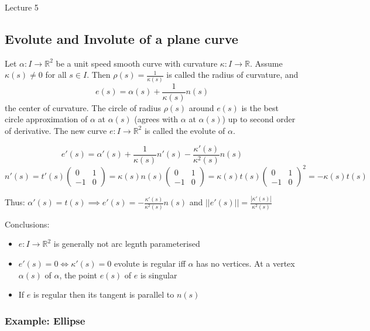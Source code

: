 \begin{center}

Lecture 5

\end{center}

\subsection{Evolute and Involute of a plane curve}

Let $\alpha: I \rightarrow \mathbb{R}^2$ be a unit speed smooth curve with curvature $\kappa: I \rightarrow \mathbb{R}$. Assume $\kappa(s) \neq 0$ for all $s \in I$. Then $\rho(s) = \frac{1}{\kappa(s)}$ is called the radius of curvature, and $$e(s) = \alpha(s) + \frac{1}{\kappa(s)} n(s)$$ the center of curvature. The circle of radius $\rho(s)$ around $e(s)$ is the best circle approximation of $\alpha$ at $\alpha(s)$ (agrees with $\alpha$ at $\alpha(s)$) up to second order of derivative. The new curve $e: I \rightarrow \mathbb{R}^2$ is called the evolute of $\alpha$.

$$e'(s) = \alpha'(s) + \frac{1}{\kappa(s)} n'(s) - \frac{\kappa'(s)}{\kappa^2(s)} n(s)$$
$$n'(s) = t'(s) \begin{pmatrix} 0 & 1 \\ -1 & 0 \end{pmatrix} = \kappa(s) n(s) \begin{pmatrix} 0 & 1 \\ -1 & 0 \end{pmatrix} = \kappa(s) t(s) \begin{pmatrix} 0 & 1 \\ -1 & 0 \end{pmatrix}^2 = -\kappa(s) t(s)$$

Thus: $\alpha'(s) = t(s) \implies e'(s) = - \frac{\kappa'(s)}{\kappa^2(s)} n(s)$ and $||e'(s)|| = \frac{|\kappa'(s)|}{\kappa^2 (s)}$

Conclusions:
\begin{itemize}
\item $e:I\rightarrow \mathbb{R}^2$ is generally not arc legnth parameterised
\item $e'(s) = 0 \Leftrightarrow \kappa'(s) = 0$ evolute is regular iff $\alpha$ has no vertices. At a vertex $\alpha(s)$ of $\alpha$, the point $e(s)$ of $e$ is singular
\item If $e$ is regular then its tangent is parallel to $n(s)$
\end{itemize}

\subsubsection*{Example: Ellipse}

